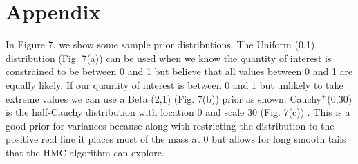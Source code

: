 \documentclass{article}
\begin{document}
\section*{Appendix}
%
%
In Figure 7, we show some sample prior distributions. The Uniform (0,1) distribution (Fig. 7(a)) can be used when we know the quantity of interest is constrained to be between 0 and 1 but believe that all values between 0 and 1 are equally likely. If our quantity of interest is between 0 and 1 but unlikely to take extreme values we can use a Beta (2,1) (Fig. 7(b))  prior as shown.  Cauchy$^{+}$(0,30) is the half-Cauchy distribution with location 0 and scale 30 (Fig. 7(c)) . This is a good prior for variances because along with restricting the distribution to the positive real line it places most of the mass at 0 but allows for long smooth tails that the HMC algorithm can explore. 
\iffalse
\end{document}
